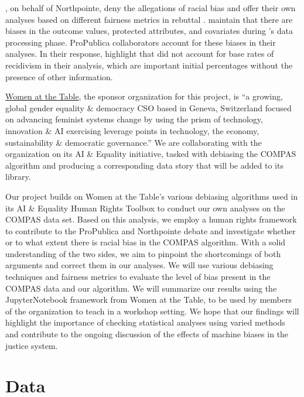 \documentclass[water,article,submit,moreauthors,pdftex]{mdpi}
\begin{document}
\citet{equivant_response_2016}, on behalf of Northpointe, deny the
allegations of racial bias and offer their own analyses based on
different fairness metrics in rebuttal \citep{equivant_response_2016}.
\citet{angwin2016machine} maintain that there are biases in the outcome
values, protected attributes, and covariates during
\citet{equivant_response_2016}'s data processing phase. ProPublica
collaborators \citet{larson2016we} account for these biases in their
analyses. In their response, \citet{equivant_response_2016} highlight
that \citet{angwin2016machine} did not account for base rates of
recidivism in their analysis, which are important initial percentages
without the presence of other information.

\href{https://www.womenatthetable.net/}{Women at the Table}, the sponsor
organization for this project, is ``a growing, global gender equality \&
democracy CSO based in Geneva, Switzerland focused on advancing feminist
systems change by using the prism of technology, innovation \& AI
exercising leverage points in technology, the economy, sustainability \&
democratic governance.'' We are collaborating with the organization on
its AI \& Equality \citep{noauthor_ai_nodate} initiative, tasked with
debiasing the COMPAS algorithm \citep{aif360-oct-2018} and producing a
corresponding data story that will be added to its library.

Our project builds on Women at the Table's various debiasing algorithms
used in its AI \& Equality Human Rights Toolbox to conduct our own
analyses on the COMPAS data set. Based on this analysis, we employ a
human rights framework to contribute to the ProPublica and Northpointe
debate and investigate whether or to what extent there is racial bias in
the COMPAS algorithm. With a solid understanding of the two sides, we
aim to pinpoint the shortcomings of both arguments and correct them in
our analyses. We will use various debiasing techniques and fairness
metrics to evaluate the level of bias present in the COMPAS data and our
algorithm. We will summarize our results using the JupyterNotebook
framework from Women at the Table, to be used by members of the
organization to teach in a workshop setting. We hope that our findings
will highlight the importance of checking statistical analyses using
varied methods and contribute to the ongoing discussion of the effects
of machine biases in the justice system.

\hypertarget{data}{%
\section{Data}\label{data}}
\end{document}

